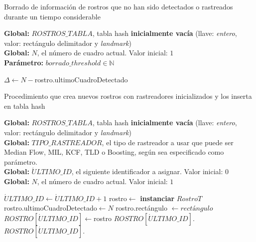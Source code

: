 \documentclass[a4paper,openright,12pt]{report}
\begin{document}
\begin{algorithm}
  \caption{Borrado de información de rostros que no han sido detectados o
      rastreados durante un tiempo considerable}
  \textbf{Global: }$ROSTROS\_TABLA$, tabla hash \textbf{inicialmente vacía}
      (llave: \textit{entero}, valor: rectángulo delimitador y \textit{landmark})\\
  \textbf{Global: }$N$, el número de cuadro actual. Valor inicial: $1$\\
  \textbf{Parámetro: }$borrado\_threshold \in \mathbb{N}$\\
  \begin{algorithmic}[1]
        \State $\Delta\gets N - $rostro.ultimoCuadroDetectado
          \State {}
        \EndIf
      \EndFor
    \EndProcedure
  \end{algorithmic}
\end{algorithm}

\begin{algorithm}
  \caption{Procedimiento que crea nuevos rostros con rastreadores inicializados
           y los inserta en tabla hash}
  \textbf{Global: }$ROSTROS\_TABLA$, tabla hash \textbf{inicialmente vacía}
      (llave: \textit{entero}, valor: rectángulo delimitador y \textit{landmark})\\
  \textbf{Global: }$TIPO\_RASTREADOR$, el tipo de rastreador a usar que puede
                                       ser Median Flow, MIL, KCF, TLD o
                                       Boosting, según sea especificado como
                                       parámetro.\\
  \textbf{Global: }$\acute{U}LTIMO\_ID$, el siguiente identificador a asignar. Valor inicial: $0$\\
  \textbf{Global: }$N$, el número de cuadro actual. Valor inicial: $1$\\
  \begin{algorithmic}[1]
        \State $\acute{U}LTIMO\_ID\gets \acute{U}LTIMO\_ID + 1$
        \State rostro$\gets$ \textbf{instanciar} $RostroT$
        \State rostro.ultimoCuadroDetectado$\gets N$
        \State rostro.rectángulo $\gets rectángulo$
        \State $ROSTRO[\acute{U}LTIMO\_ID]\gets$rostro
        \State $ROSTRO[\acute{U}LTIMO\_ID].$
        \State $ROSTRO[\acute{U}LTIMO\_ID].$
      \EndFor
    \EndProcedure
  \end{algorithmic}
\end{algorithm}
\end{document}
